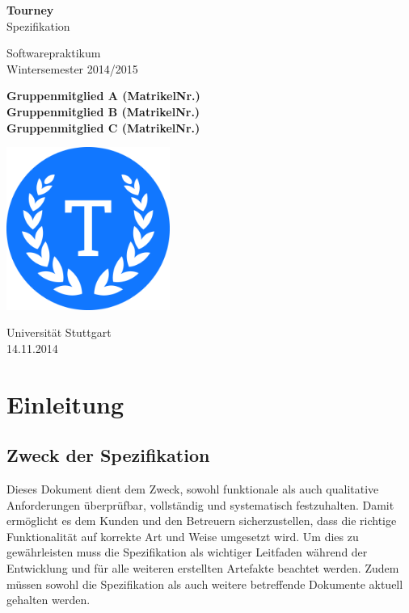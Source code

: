 \documentclass[11pt]{article}
\begin{document}
\begin{titlepage}
	\begin{center}
		\vspace*{1cm}

		\Huge
		\textbf{Tourney}\\
		Spezifikation

		\vspace{0.5cm}
		\LARGE
		Softwarepraktikum\\
		\Large
		Wintersemester 2014/2015

		\vspace{1.5cm}

		\large
		\textbf{Gruppenmitglied A (MatrikelNr.)\\
				 Gruppenmitglied B (MatrikelNr.)\\
				 Gruppenmitglied C (MatrikelNr.)}

		\vfill

		\includegraphics[width=0.4\textwidth]{Logo.png}

		\vspace{1.5cm}

		\Large
		Universität Stuttgart\\
		14.11.2014
	\end{center}
\end{titlepage}

\newpage

\tableofcontents
\newpage

\section{Einleitung}

\subsection{Zweck der Spezifikation}

Dieses Dokument dient dem Zweck, sowohl funktionale als auch qualitative Anforderungen überprüfbar, vollständig und systematisch festzuhalten. Damit ermöglicht es dem Kunden und den Betreuern sicherzustellen, dass die richtige Funktionalität auf korrekte Art und Weise umgesetzt wird. Um dies zu gewährleisten muss die Spezifikation als wichtiger Leitfaden während der Entwicklung und für alle weiteren erstellten Artefakte beachtet werden. Zudem müssen sowohl die Spezifikation als auch weitere betreffende Dokumente aktuell gehalten werden.
\end{document}
